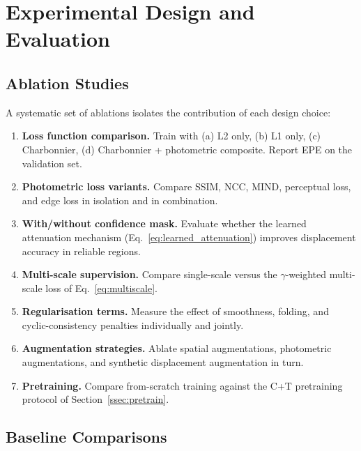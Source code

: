 \section{Experimental Design and Evaluation}
\label{sec:experiments}

\subsection{Ablation Studies}
\label{ssec:ablation}

A systematic set of ablations isolates the contribution of each design
choice:

\begin{enumerate}
  \item \textbf{Loss function comparison.}  Train with (a) L2 only, (b) L1
        only, (c) Charbonnier, (d) Charbonnier + photometric composite.
        Report EPE on the validation set.
  \item \textbf{Photometric loss variants.}  Compare SSIM, NCC, MIND,
        perceptual loss, and edge loss in isolation and in combination.
  \item \textbf{With/without confidence mask.}  Evaluate whether the learned
        attenuation mechanism (Eq.~\ref{eq:learned_attenuation}) improves
        displacement accuracy in reliable regions.
  \item \textbf{Multi-scale supervision.}  Compare single-scale versus the
        $\gamma$-weighted multi-scale loss of Eq.~\eqref{eq:multiscale}.
  \item \textbf{Regularisation terms.}  Measure the effect of smoothness,
        folding, and cyclic-consistency penalties individually and jointly.
  \item \textbf{Augmentation strategies.}  Ablate spatial augmentations,
        photometric augmentations, and synthetic displacement augmentation in
        turn.
  \item \textbf{Pretraining.}  Compare from-scratch training against the
        C+T pretraining protocol of Section~\ref{ssec:pretrain}.
\end{enumerate}

\subsection{Baseline Comparisons}
\label{ssec:baselines}

